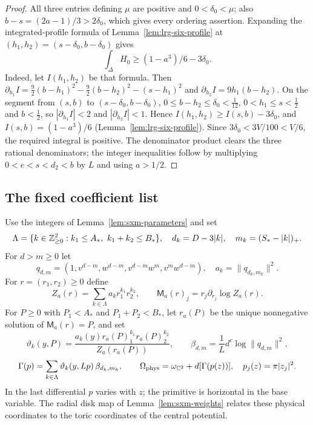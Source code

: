 \begin{proof}
All three entries defining $\mu$ are positive and $0<\delta_0<\mu$; also
$b-s=(2a-1)/3>2\delta_0$, which gives every ordering assertion.
Expanding the integrated-profile formula of Lemma~\ref{lem:lrg-six-profile} at
$(h_1,h_2)=(s-\delta_0,b-\delta_0)$ gives
\[
 \int_\Delta H_0\ge(1-a^3)/6-3\delta_0.
\]
Indeed, let $I(h_1,h_2)$ be that formula. Then
$\partial_{h_1}I=\frac92(b-h_1)^2-\frac92(b-h_2)^2-(s-h_1)^2$ and $\partial_{h_2}I=9h_1(b-h_2)$. On the segment from $(s,b)$ to
$(s-\delta_0,b-\delta_0)$, $0\le b-h_2\le\delta_0<\frac1{12}$, $0<h_1\le s<\frac12$ and $b<\frac12$, so
$|\partial_{h_1}I|<2$ and $|\partial_{h_2}I|<1$. Hence $I(h_1,h_2)\ge I(s,b)-3\delta_0$, and $I(s,b)=(1-a^3)/6$
(Lemma~\ref{lem:lrg-six-profile}). Since $3\delta_0<3V/100<V/6$, the required integral is positive.
The denominator product clears the three rational denominators; the integer
inequalities follow by multiplying $0<e<s<d_2<b$ by $L$ and using $a>1/2$.
\end{proof}

\subsection{The fixed coefficient list}\label{sec:sxm-weights}

\begin{definition}\label{def:sxm-data}
Use the integers of Lemma~\ref{lem:sxm-parameters} and set
\[
 \Lambda=\{k\in\Z_{\ge0}^2:k_1\le A_*,\ k_1+k_2\le B_*\},\quad
 d_k=D-3|k|,\quad m_k=(S_*-|k|)_+.
\]
For $d>m\ge0$ let
\[
 q_{d,m}=(1,v^{d-m},w^{d-m},v^{d-m}w^m,v^mw^{d-m}),\quad a_k=\|q_{d_k,m_k}\|^2.
\]
For $r=(r_1,r_2)\ge0$ define
\[
 Z_a(r)=\sum_{k\in\Lambda}a_kr_1^{k_1}r_2^{k_2},\qquad
 \mathsf M_a(r)_j=r_j\partial_{r_j}\log Z_a(r).
\]
For $P\ge0$ with $P_1<A_*$ and $P_1+P_2<B_*$, let $r_a(P)$ be the unique nonnegative solution
of $\mathsf M_a(r)=P$, and set
\[
 \vartheta_k(y,P)=\frac{a_k(y)r_a(P)_1^{k_1}r_a(P)_2^{k_2}}{Z_a(r_a(P))},\qquad
 \beta_{d,m}=\frac1L d^c\log\|q_{d,m}\|^2,
\]
\[
 \Gamma(p)=\sum_{k\in\Lambda}\vartheta_k(y,Lp)\,\beta_{d_k,m_k},\qquad
 \Omega_{\rm phys}=\omega_{\mathbb{C}^2}+d[\Gamma(p(z))],\quad p_j(z)=\pi|z_j|^2.
\]
In the last differential $p$ varies with $z$; the primitive is horizontal in the base
variable. The radial disk map of Lemma~\ref{lem:sxm-weights} relates these physical
coordinates to the toric coordinates of the central potential.
\end{definition}

